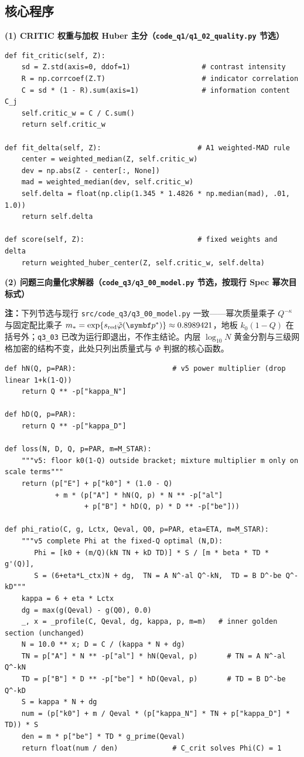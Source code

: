 \subsection{核心程序}

\textbf{(1) CRITIC 权重与加权 Huber 主分（\texttt{code\_q1/q1\_02\_quality.py} 节选）}
\begin{lstlisting}
def fit_critic(self, Z):
    sd = Z.std(axis=0, ddof=1)                 # contrast intensity
    R = np.corrcoef(Z.T)                       # indicator correlation
    C = sd * (1 - R).sum(axis=1)               # information content C_j
    self.critic_w = C / C.sum()
    return self.critic_w

def fit_delta(self, Z):                       # A1 weighted-MAD rule
    center = weighted_median(Z, self.critic_w)
    dev = np.abs(Z - center[:, None])
    mad = weighted_median(dev, self.critic_w)
    self.delta = float(np.clip(1.345 * 1.4826 * np.median(mad), .01, 1.0))
    return self.delta

def score(self, Z):                           # fixed weights and delta
    return weighted_huber_center(Z, self.critic_w, self.delta)
\end{lstlisting}

\textbf{(2) 问题三向量化求解器（\texttt{code\_q3/q3\_00\_model.py} 节选，按现行 Spec 幂次目标式）}

\textbf{注：}下列节选与现行 \texttt{src/code\_q3/q3\_00\_model.py} 一致——幂次质量乘子 $Q^{-\kappa}$ 与固定配比乘子 $m_*=\exp\{s_{\rm red}\tilde\varphi(\bp^*)\}\approx0.8989421$，地板 $k_0(1-Q)$ 在括号外；\texttt{q3\_03} 已改为运行即退出，不作主结论。内层 $\log_{10}N$ 黄金分割与三级网格加密的结构不变，此处只列出质量式与 $\Phi$ 判据的核心函数。
\begin{lstlisting}
def hN(Q, p=PAR):                       # v5 power multiplier (drop linear 1+k(1-Q))
    return Q ** -p["kappa_N"]

def hD(Q, p=PAR):
    return Q ** -p["kappa_D"]

def loss(N, D, Q, p=PAR, m=M_STAR):
    """v5: floor k0(1-Q) outside bracket; mixture multiplier m only on scale terms"""
    return (p["E"] + p["k0"] * (1.0 - Q)
            + m * (p["A"] * hN(Q, p) * N ** -p["al"]
                   + p["B"] * hD(Q, p) * D ** -p["be"]))

def phi_ratio(C, g, Lctx, Qeval, Q0, p=PAR, eta=ETA, m=M_STAR):
    """v5 complete Phi at the fixed-Q optimal (N,D):
       Phi = [k0 + (m/Q)(kN TN + kD TD)] * S / [m * beta * TD * g'(Q)],
       S = (6+eta*L_ctx)N + dg,  TN = A N^-al Q^-kN,  TD = B D^-be Q^-kD"""
    kappa = 6 + eta * Lctx
    dg = max(g(Qeval) - g(Q0), 0.0)
    _, x = _profile(C, Qeval, dg, kappa, p, m=m)   # inner golden section (unchanged)
    N = 10.0 ** x; D = C / (kappa * N + dg)
    TN = p["A"] * N ** -p["al"] * hN(Qeval, p)       # TN = A N^-al Q^-kN
    TD = p["B"] * D ** -p["be"] * hD(Qeval, p)       # TD = B D^-be Q^-kD
    S = kappa * N + dg
    num = (p["k0"] + m / Qeval * (p["kappa_N"] * TN + p["kappa_D"] * TD)) * S
    den = m * p["be"] * TD * g_prime(Qeval)
    return float(num / den)             # C_crit solves Phi(C) = 1
\end{lstlisting}

